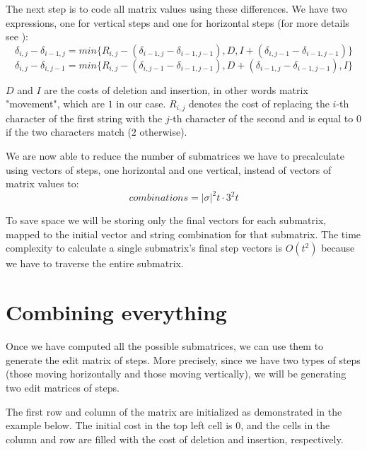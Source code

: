 \documentclass[times, utf8, seminar, numeric]{fer}
\begin{document}
The next step is to code all matrix values using these differences. We have two expressions, one for vertical steps and one for horizontal steps (for more details see \citep{masek1980faster}):
\begin{equation}
\delta_{i,j} - \delta_{i-1,j} = min\{R_{i,j} - (\delta_{i-1,j}-\delta_{i-1,j-1}), D, I + (\delta_{i,j-1} - \delta_{i-1, j-1})\}
\end{equation}
\begin{equation}
\delta_{i,j} - \delta_{i,j-1} = min\{R_{i,j} - (\delta_{i,j-1}-\delta_{i-1,j-1}), D + (\delta_{i-1,j} - \delta_{i-1, j-1}), I\}
\end{equation}

$D$ and $I$ are the costs of deletion and insertion, in other words matrix "movement", which are $1$ in our case. $R_{i,j}$ denotes the cost of replacing the $i$-th character of the first string with the $j$-th character of the second and is equal to $0$ if the two characters match ($2$ otherwise).

We are now able to reduce the number of submatrices we have to precalculate using vectors of steps, one horizontal and one vertical, instead of vectors of matrix values to:
\begin{equation}
combinations = |\sigma|^2t \cdot 3^2t
\end{equation}

To save space we will be storing only the final vectors for each submatrix, mapped to the initial vector and string combination for that submatrix. The time complexity to calculate a single submatrix's final step vectors is $O(t^2)$ because we have to traverse the entire submatrix.

\section{Combining everything}
Once we have computed all the possible submatrices, we can use them to generate the edit matrix of steps. More precisely, since we have two types of steps (those moving horizontally and those moving vertically), we will be generating two edit matrices of steps.

The first row and column of the matrix are initialized as demonstrated in the example below. The initial cost in the top left cell is 0, and the cells in the column and row are filled with the cost of deletion and insertion, respectively.
\end{document}

